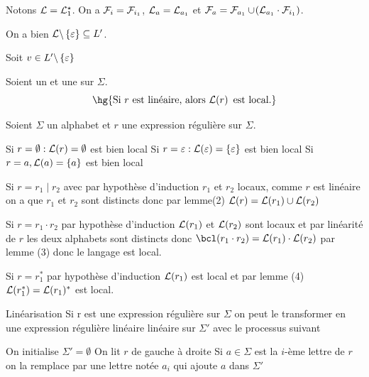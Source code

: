 \documentclass[a4paper,french,bookmarks]{book}
\begin{document}
\begin{nproof}
\begin{psse}
\begin{enumerate}
            \end{enumerate}     
            
            \item Notons $\mathcal{L} = \mathcal{L}_1^\star$. On a $\mathcal{F}_i = \mathcal{F}_{i_1}$, $\mathcal{L}_a = \mathcal{L}_{a_1}$ et $\mathcal{F}_a = \mathcal{F}_{a_1} \cup \!\left(\mathcal{L}_{a_1} \cdot \mathcal{F}_{i_1}\right)$.
                
            On a bien $\mathcal{L} \backslash \left\{\varepsilon\right\} \subseteq L'$.
                
                Soit $v \in L' \backslash \left\{\varepsilon\right\} $

        \end{psse}
    \end{nproof}
    
    
    \begin{property}{}{}
        Soient \hg{$\Sigma$} un  et  une  sur $\Sigma$.
        \[ \hg{\text{Si} \ r \ \text{est linéaire, alors} \ \bcL\p{r} \ \text{est local.}} \]
    \end{property}
    
    \begin{nproof}
        Soient $\Sigma$ un alphabet et $r$ une expression régulière sur $\Sigma$.
        \begin{enumerate}
            \itt Si \(r = \emptyset : \mathcal{L}(r) = \emptyset\) est bien local
            \itt Si \(r= \varepsilon : \mathcal{L}(\varepsilon) = \left\{\varepsilon\right\}\) est bien local
            \itt Si \(r=a, \mathcal{L}(a) = \left\{a\right\}\) est bien local

            \itt Si \(r = r_1 \mid r_2\) avec par hypothèse d'induction \(r_1\) et \(r_2\) locaux, comme \(r\) est linéaire on a que \(r_1\) et \(r_2\) sont distincts donc par lemme(2) \(\mathcal{L}(r) = \mathcal{L}(r_1)\cup\mathcal{L}(r_2)\)

            \itt Si \(r = r_1 \cdot r_2\) par hypothèse d'induction \(\mathcal{L}(r_1)\) et \(\mathcal{L}(r_2)\) sont locaux et par linéarité de \(r\) les deux alphabets sont distincts donc \(\bcl(r_1\cdot r_2) = \bcL(r_1) \cdot \bcL(r_2)\) par lemme (3) donc le langage est local.

            \itt Si \(r = r_1^*\) par hypothèse d'induction \(\mathcal{L}(r_1)\) est local et par lemme (4) \(\mathcal{L}(r_1^*) = \mathcal{L}(r_1)^*\) est local.
        \end{enumerate}
    \end{nproof}
    
    \begin{definition}{Linéarisation}
        Si r est une expression régulière sur $\Sigma$ on peut le transformer en une 
        expression régulière linéaire linéaire sur $\Sigma'$ avec le processus suivant
        \begin{enumerate}
            \itast On initialise \(\Sigma' = \emptyset\)
            \itast On lit \(r\) de gauche à droite 
            \itast Si \(a\in\Sigma\) est la \(i\)-ème lettre de \(r\) on la remplace par une lettre notée \(a_i\) qui ajoute \(a\) dans \(\Sigma'\)
        \end{enumerate}
    \end{definition}
    
\end{document}
